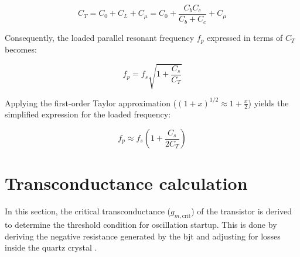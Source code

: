 \begin{equation}
	C_T = C_0 + C_L + C_\mu = C_0 + \frac{C_b C_c}{C_b + C_c} + C_\mu
\end{equation}

Consequently, the loaded parallel resonant frequency $f_p$ expressed in terms of $C_T$ becomes:

\begin{equation}
	f_p = f_s \sqrt{1 + \frac{C_s}{C_T}}
\end{equation}

Applying the first-order Taylor approximation ($(1+x)^{1/2} \approx 1 + \frac{x}{2}$) yields the simplified expression for the loaded frequency:

\begin{equation}
	f_p \approx f_s \left(1 + \frac{C_s}{2 C_T}\right)
\end{equation}


\section{Transconductance calculation}

In this section, the critical transconductance ($g_{m,\text{crit}}$) of the transistor is derived to determine the threshold condition for oscillation startup. This is done by deriving the negative resistance generated by the \gls{bjt} and adjusting for losses inside the quartz crystal \cite{sansenDesignCrystalOscillators2006}.

